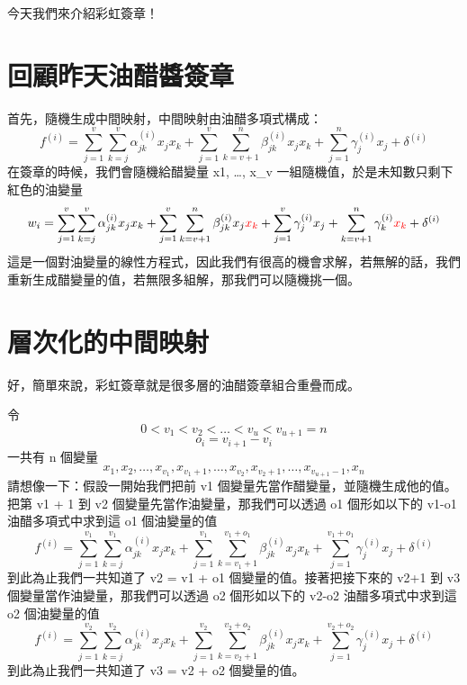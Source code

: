 \documentclass[
]{article}
\author{}
\date{}
\begin{document}
今天我們來介紹彩虹簽章！

\hypertarget{ux56deux9867ux6628ux5929ux6cb9ux918bux91acux7c3dux7ae0}{%
\section{回顧昨天油醋醬簽章}\label{ux56deux9867ux6628ux5929ux6cb9ux918bux91acux7c3dux7ae0}}

首先，隨機生成中間映射，中間映射由油醋多項式構成： \[
f^{(i)}
=
\sum_{j=1}^{v} \sum_{k=j}^{v}\alpha_{jk}^{(i)} x_{j}x_{k} 
+
\sum_{j=1}^{v} \sum_{k=v+1}^{n}\beta_{jk}^{(i)} x_{j}x_{k} 
+
\sum_{j=1}^{n} \gamma_{j}^{(i)} x_{j} +\delta^{(i)}
\] 在簽章的時候，我們會隨機給醋變量 x1, \ldots, x\_v
一組隨機值，於是未知數只剩下紅色的油變量 \[
w_{i}
=
\sum_{j=1}^{v} \sum_{k=j}^{v}\alpha_{jk}^{(i)} x_{j}x_{k} 
+
\sum_{j=1}^{v} \sum_{k=v+1}^{n}\beta_{jk}^{(i)} x_{j}{\color{red}x_{k}}
+
\sum_{j=1}^{v} \gamma_{j}^{(i)} x_{j}
+
\sum_{k=v+1}^{n} \gamma_{k}^{(i)} {\color{red}x_{k}}+\delta^{(i)}
\]
這是一個對油變量的線性方程式，因此我們有很高的機會求解，若無解的話，我們重新生成醋變量的值，若無限多組解，那我們可以隨機挑一個。

\hypertarget{ux5c64ux6b21ux5316ux7684ux4e2dux9593ux6620ux5c04}{%
\section{層次化的中間映射}\label{ux5c64ux6b21ux5316ux7684ux4e2dux9593ux6620ux5c04}}

好，簡單來說，彩虹簽章就是很多層的油醋簽章組合重疊而成。

令 \[
0 < v_{1}<v_{2}<\dots<v_{u}<v_{u+1}=n
\] \[
o_{i} = v_{i+1} - v_{i}
\] 一共有 n 個變量 \[
x_{1},x_{2},\dots,x_{v_{1}},x_{v_{1}+1},\dots, x_{v_{2}},x_{v_{2}+1},\dots,x_{v_{u+1}-1},x_{n}
\] 請想像一下：假設一開始我們把前 v1
個變量先當作醋變量，並隨機生成他的值。把第 v1 + 1 到 v2
個變量先當作油變量，那我們可以透過 o1 個形如以下的 v1-o1
油醋多項式中求到這 o1 個油變量的值 \[
f^{(i)}
=
\sum_{j=1}^{v_{1}} \sum_{k=j}^{v_{1}}\alpha_{jk}^{(i)} x_{j}x_{k} 
+
\sum_{j=1}^{v_{1}} \sum_{k=v_{1}+1}^{v_{1}+o_{1}}\beta_{jk}^{(i)} x_{j}x_{k} 
+
\sum_{j=1}^{v_{1}+o_{1}} \gamma_{j}^{(i)} x_{j} +\delta^{(i)}
\] 到此為止我們一共知道了 v2 = v1 + o1 個變量的值。接著把接下來的 v2+1
到 v3 個變量當作油變量，那我們可以透過 o2 個形如以下的 v2-o2
油醋多項式中求到這 o2 個油變量的值 \[
f^{(i)}
=
\sum_{j=1}^{v_{2}} \sum_{k=j}^{v_{2}}\alpha_{jk}^{(i)} x_{j}x_{k} 
+
\sum_{j=1}^{v_{2}} \sum_{k=v_{2}+1}^{v_{2}+o_{2}}\beta_{jk}^{(i)} x_{j}x_{k} 
+
\sum_{j=1}^{v_{2}+o_{2}} \gamma_{j}^{(i)} x_{j} +\delta^{(i)}
\] 到此為止我們一共知道了 v3 = v2 + o2 個變量的值。
\end{document}
